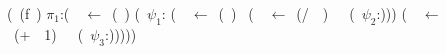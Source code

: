 {\small
  \renewcommand{\arraystretch}{1}{
    \begin{uprogram}
      \UFL (\DEFINE~(f~\px)
       $\pi_1$:(\LET~\py~$\leftarrow $\
      (\length~\px) \IN
       (\SIF~$\psi_1$:\py
      (\LET~\pu~$\leftarrow$~(\Sum~\px)~\IN
       (\LET~\pw~$\leftarrow$\ (/~\pu~\py)~\IN\ \ (\SRETURN~$\psi_2$:\pw)))
      \UNL{5}(\LET~\pz~$\leftarrow$~(+~\py~1)~\IN\ \ (\SRETURN~$\psi_3$:\pz)))))   
  \end{uprogram}}
}
\vspace*{.1cm}
